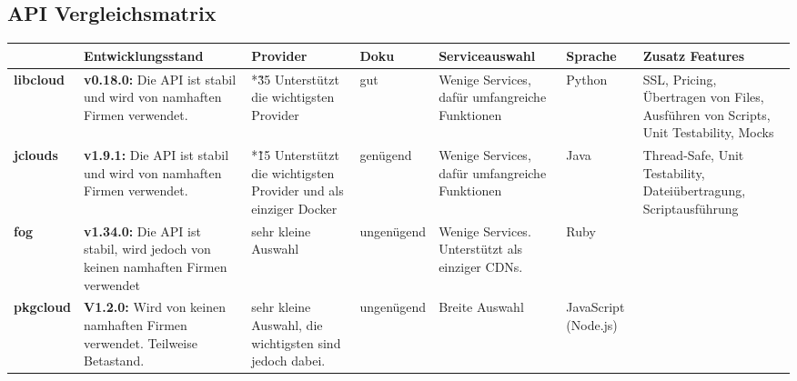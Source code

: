 
\begin{landscape}
  \subsection{API Vergleichsmatrix}
  \label{API Vergleichsmatrix}
\begin{table}[h]  
  \begin{tabularx}{\linewidth}{|l|X|X|l|X|l|X|}
    \hline
    &
    \textbf{Entwicklungsstand}
    &
    \textbf{Provider}
    &
    \textbf{Doku}
    &
    \textbf{Serviceauswahl}
    &
    \textbf{Sprache}
    &
    \textbf{Zusatz Features}
   \\
  \hline
  \textbf{libcloud} & \cellcolor{green!25} \textbf{v0.18.0:} 
  Die API ist stabil und wird von namhaften Firmen verwendet.
  & 
  \cellcolor{green!25}
  *\~35 Unterstützt die wichtigsten Provider
  & 
   \cellcolor{green!25}
   gut
  & 
   \cellcolor{green!25}
  Wenige Services, dafür umfangreiche Funktionen
  & 
     \cellcolor{yellow!25}
  Python
  & 
  \cellcolor{green!25}
  SSL, Pricing, Übertragen von Files, Ausführen von Scripts, Unit Testability, Mocks
  \\
  \hline
 \textbf{jclouds}
& 
\cellcolor{green!25} 
\textbf{v1.9.1:} Die API ist stabil und wird von namhaften 
Firmen verwendet.
&	
\cellcolor{green!25}
*\~15
Unterstützt die wichtigsten Provider und als einziger Docker
&
\cellcolor{yellow!25}
genügend
&
\cellcolor{green!25}
Wenige Services, dafür umfangreiche Funktionen	
&
\cellcolor{green!25}
Java	
&
\cellcolor{green!25}
Thread-Safe, Unit Testability, Dateiübertragung, Scriptausführung
 \\
 \hline
 \textbf{fog}
 &
 \cellcolor{yellow!25}	
 \textbf{v1.34.0:} 
 Die API ist stabil, wird jedoch von keinen namhaften Firmen verwendet
 &
 \cellcolor{red!50}
 sehr kleine Auswahl
 &
  \cellcolor{red!50}	
ungenügend	
&
 \cellcolor{red!50}
Wenige Services. Unterstützt als einziger CDNs.	
&
 \cellcolor{red!50}
Ruby
&
 \cellcolor{red!50}
\\
\hline
\textbf{pkgcloud}
&
 \cellcolor{yellow!25}	
\textbf{V1.2.0:} Wird von keinen namhaften Firmen verwendet. Teilweise Betastand.
&
\cellcolor{green!25}
sehr kleine Auswahl, die wichtigsten sind jedoch dabei.
&
\cellcolor{red!50}
ungenügend	
&
\cellcolor{green!25}
Breite Auswahl
&
 \cellcolor{yellow!25}	
JavaScript (Node.js)
&
 \cellcolor{yellow!25}	

\end{tabularx}
\end{table}
\end{landscape}
